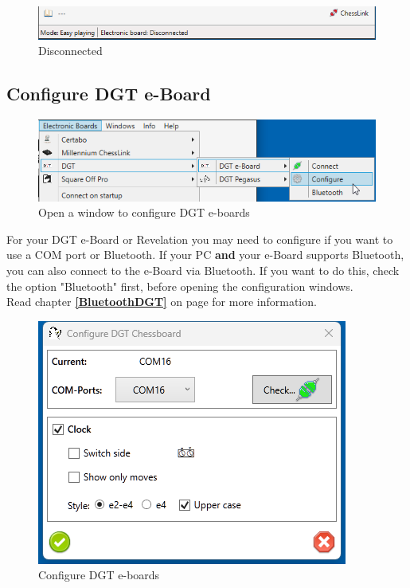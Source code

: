 \documentclass[11pt,a4paper]{article}
\begin{document}
\begin{figure}[H]
	\centering
	\includegraphics[scale=0.8]{MillenniumChessLink8.png}
	\caption{Disconnected}
	\label{fig:MillenniumChessLink8}
\end{figure}

\subsection{Configure DGT e-Board} \label{ConfigureDGTEBoard}
\begin{figure}[H]
	\centering
	\includegraphics[scale=0.8]{DGTEBoard1.png}
	\caption{Open a window to configure DGT e-boards }
	\label{fig:DGTEBoard1}
\end{figure}

For your DGT e-Board or Revelation you may need to configure if you want to use a COM port or Bluetooth. 
If your PC \textbf{and} your e-Board supports Bluetooth, you can also connect to the e-Board via Bluetooth. If you want to do this, check the option "Bluetooth" first, before opening the configuration windows.\\
Read chapter \textbf{\ref{BluetoothDGT}  } on page \pageref{BluetoothDGT} for more information.

\begin{figure}[H]
	\centering
	\includegraphics[scale=1.0]{DGTEBoard2.png}
	\caption{Configure DGT e-boards }
	\label{fig:DGTEBoard2}
\end{figure}
\end{document}
